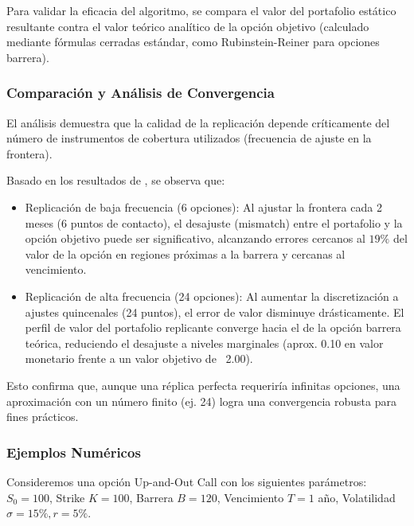 Para validar la eficacia del algoritmo, se compara el valor del portafolio estático resultante contra el valor teórico analítico de la opción objetivo (calculado mediante fórmulas cerradas estándar, como Rubinstein-Reiner para opciones barrera).

\subsubsection*{Comparación y Análisis de Convergencia} 

El análisis demuestra que la calidad de la replicación depende críticamente del número de instrumentos de cobertura utilizados (frecuencia de ajuste en la frontera).

Basado en los resultados de \cite{derman1994static}, se observa que: 

\begin{itemize} 
  \item Replicación de baja frecuencia (6 opciones): Al ajustar la frontera cada 2 meses (6 puntos de contacto), el desajuste (mismatch) entre el portafolio y la opción objetivo puede ser significativo, alcanzando errores cercanos al $19\%$ del valor de la opción en regiones próximas a la barrera y cercanas al vencimiento. 
  
  \item Replicación de alta frecuencia (24 opciones): Al aumentar la discretización a ajustes quincenales (24 puntos), el error de valor disminuye drásticamente. El perfil de valor del portafolio replicante converge hacia el de la opción barrera teórica, reduciendo el desajuste a niveles marginales (aprox. 0.10 en valor monetario frente a un valor objetivo de ~2.00). 
\end{itemize}

Esto confirma que, aunque una réplica perfecta requeriría infinitas opciones, una aproximación con un número finito (ej. 24) logra una convergencia robusta para fines prácticos.

\subsubsection*{Ejemplos Numéricos} 

Consideremos una opción Up-and-Out Call con los siguientes parámetros: $S_0=100$, Strike $K=100$, Barrera $B=120$, Vencimiento $T=1$ año, Volatilidad $\sigma=15\%, r=5\%$.

